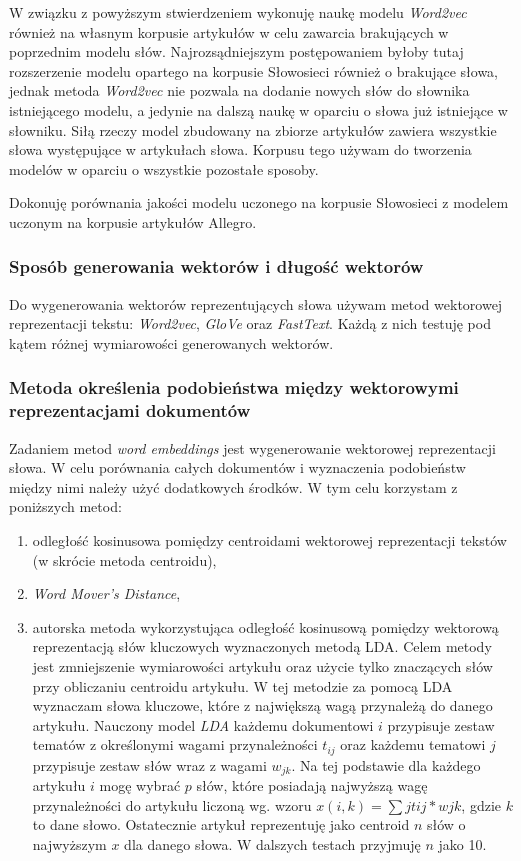 \documentclass[pl]{minipw} %
\begin{document}
W związku z powyższym stwierdzeniem wykonuję naukę modelu \textit{Word2vec} również na własnym korpusie artykułów w celu zawarcia brakujących w poprzednim modelu słów. Najrozsądniejszym postępowaniem byłoby tutaj rozszerzenie modelu opartego na korpusie Słowosieci również o brakujące słowa, jednak metoda \textit{Word2vec} nie pozwala na dodanie nowych słów do słownika istniejącego modelu, a jedynie na dalszą naukę w oparciu o słowa już istniejące w słowniku. Siłą rzeczy model zbudowany na zbiorze artykułów zawiera wszystkie słowa występujące w artykułach słowa. Korpusu tego używam do tworzenia modelów w oparciu o wszystkie pozostałe sposoby.

Dokonuję porównania jakości modelu uczonego na korpusie Słowosieci z modelem uczonym na korpusie artykułów Allegro.

\subsubsection{Sposób generowania wektorów i długość wektorów}
Do wygenerowania wektorów reprezentujących słowa używam metod wektorowej reprezentacji tekstu: \textit{Word2vec}, \textit{GloVe} oraz \textit{FastText}. Każdą z nich testuję pod kątem różnej wymiarowości generowanych wektorów.

\subsubsection{Metoda określenia podobieństwa między wektorowymi reprezentacjami dokumentów}
Zadaniem metod \textit{word embeddings} jest wygenerowanie wektorowej reprezentacji słowa. W celu porównania całych dokumentów i wyznaczenia podobieństw między nimi należy użyć dodatkowych środków. W tym celu korzystam z poniższych metod:
\begin{enumerate}
	\item odległość kosinusowa pomiędzy centroidami wektorowej reprezentacji tekstów (w skrócie metoda centroidu),
	\item \textit{Word Mover's Distance},
	\item autorska metoda wykorzystująca odległość kosinusową pomiędzy wektorową reprezentacją słów kluczowych wyznaczonych metodą LDA. Celem metody jest zmniejszenie wymiarowości artykułu oraz użycie tylko znaczących słów przy obliczaniu centroidu artykułu. W tej metodzie za pomocą LDA wyznaczam słowa kluczowe, które z największą wagą przynależą do danego artykułu. Nauczony model \textit{LDA} każdemu dokumentowi $i$ przypisuje zestaw tematów z określonymi wagami przynależności $t_{ij}$ oraz każdemu tematowi $j$ przypisuje zestaw słów wraz z wagami $w_{jk}$. Na tej podstawie dla każdego artykułu $i$ mogę wybrać $p$ słów, które posiadają najwyższą wagę przynależności do artykułu liczoną wg. wzoru $x(i,k)=\sum{j}t{ij}*w{jk}$, gdzie $k$ to dane słowo. Ostatecznie artykuł reprezentuję jako centroid $n$ słów o najwyższym $x$ dla danego słowa. W dalszych testach przyjmuję $n$ jako 10.
\end{enumerate}
\end{document}
